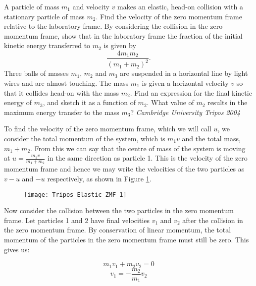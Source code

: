 
%
%
\begin{problem} %
 {A particle of mass $m_{1}$ and velocity $v$ makes an elastic, head-on collision with a stationary particle of mass $m_{2}$.  Find the velocity of the zero momentum frame relative to the laboratory frame.  By considering the collision in the zero momentum frame, show that in the laboratory frame the fraction of the initial kinetic energy transferred to $m_{2}$ is given by
 \begin{equation}
  \frac{4m_{1}m_{2}}{(m_{1}+m_{2})^{2}}.
 \end{equation}
Three balls of masses $m_{1}$, $m_{2}$ and $m_{3}$ are suspended in a horizontal line by light wires and are almost touching.  The mass $m_{1}$ is given a horizontal velocity $v$ so that it collides head-on with the mass $m_{2}$.  Find an expression for the final kinetic energy of $m_{3}$, and sketch it as a function of $m_{2}$.  What value of $m_{2}$ results in the maximum energy transfer to the mass $m_{3}$?}
{\textit{Cambridge University Tripos 2004}}
{
To find the velocity of the zero momentum frame, which we will call $u$, we consider the total momentum of the system, which is $m_1 v$ and the total mass, $m_1 + m_2$. From this we can say that the centre of mass of the system is moving at $u=\frac{m_1 v}{m_1 + m_2}$ in the same direction as particle 1. This is the velocity of the zero momentum frame and hence we may write the velocities of the two particles as $v-u$ and $-u$ respectively, as shown in Figure \ref{fig:Tripos_Elastic_ZMF_1}.

\begin{figure}[h]
	\centering
	\texttt{[image: Tripos\_Elastic\_ZMF\_1]}
	\caption{}
	\label{fig:Tripos_Elastic_ZMF_1}
\end{figure}

Now consider the collision between the two particles in the zero momentum frame. Let particles 1 and 2 have final velocities $v_1$ and $v_2$ after the collision in the zero momentum frame. By conservation of linear momentum, the total momentum of the particles in the zero momentum frame must still be zero. This gives us:

\begin{equation*}m_1 v_1 + m_2 v_2=0\end{equation*}
\begin{equation}v_1=-\frac{m_2}{m_1}v_2\end{equation}

}
\end{problem}
